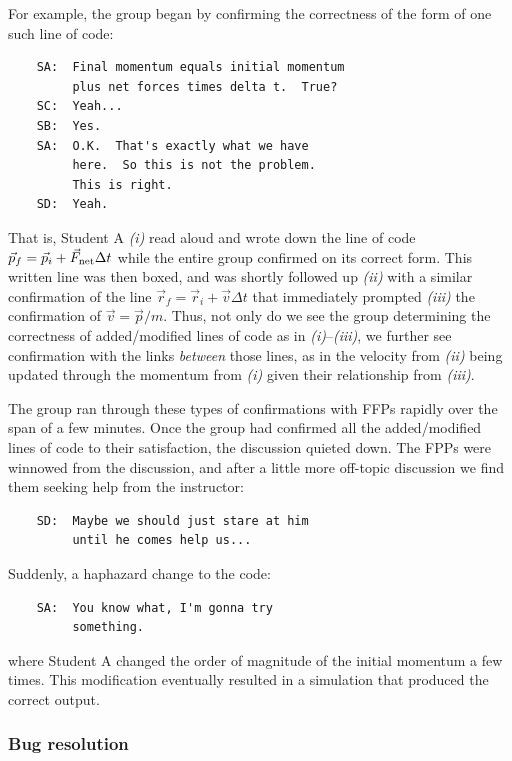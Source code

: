 \documentclass{msuphddissertation}
\begin{document}
\begin{doublespace}
For example, the group began by confirming the correctness of the form of one such line of code:  \begin{verbatim}
    SA:  Final momentum equals initial momentum
         plus net forces times delta t.  True?
    SC:  Yeah...
    SB:  Yes.
    SA:  O.K.  That's exactly what we have 
         here.  So this is not the problem.
         This is right.
    SD:  Yeah.
\end{verbatim}  That is, Student A \emph{(i)} read aloud and wrote down the line of code $\vec{p}_{f}=\vec{p}_{i}+\vec{F}_{\rm net}\Delta t$ while the entire group confirmed on its correct form.  This written line was then boxed, and was shortly followed up \emph{(ii)} with a similar confirmation of the line $\vec{r}_{f}=\vec{r}_{i}+\vec{v}\Delta t$ that immediately prompted \emph{(iii)} the confirmation of $\vec{v}=\vec{p}/m$.  Thus, not only do we see the group determining the correctness of added/modified lines of code as in \emph{(i)}--\emph{(iii)}, we further see confirmation with the links \emph{between} those lines, as in the velocity from \emph{(ii)} being updated through the momentum from \emph{(i)} given their relationship from \emph{(iii)}.

The group ran through these types of confirmations with FFPs rapidly over the span of a few minutes.  Once the group had confirmed all the added/modified lines of code to their satisfaction, the discussion quieted down.  The FPPs were winnowed from the discussion, and after a little more off-topic discussion we find them seeking help from the instructor:  \begin{verbatim}
    SD:  Maybe we should just stare at him 
         until he comes help us...
\end{verbatim} Suddenly, a haphazard change to the code:  \begin{verbatim}
    SA:  You know what, I'm gonna try 
         something.
\end{verbatim} where Student A changed the order of magnitude of the initial momentum a few times.  This modification eventually resulted in a simulation that produced the correct output.

\subsubsection{Bug resolution}


\end{doublespace}
\end{document}

